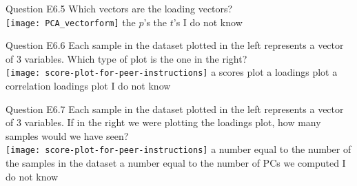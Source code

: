 \begin{frame}{Question E6.5}
	\QuestionBody
	{
		Which vectors are the loading vectors? \vspace{0.2cm} \\
		\centering
		\texttt{[image: PCA\_vectorform]}
	}
	\QuestionAnswers
	{
		\correctanswer the $p$'s
		\answer the $t$'s
		\answer I do not know
	}
\end{frame}


\begin{frame}{Question E6.6}
	\QuestionBody
	{
		Each sample in the dataset plotted in the left represents a vector of 3 variables. Which type of plot is the one in the right? \vspace{0.2cm} \\
		\centering
		\texttt{[image: score-plot-for-peer-instructions]}
	}
	\QuestionAnswers
	{
		\correctanswer a scores plot
		\answer a loadings plot
		\answer a correlation loadings plot
		\answer I do not know
	}
\end{frame}


\begin{frame}{Question E6.7}
	\QuestionBody
	{
		Each sample in the dataset plotted in the left represents a vector of 3 variables. If in the right we were plotting the loadings plot, how many samples would we have seen? \vspace{0.2cm} \\
		\centering
		\texttt{[image: score-plot-for-peer-instructions]}
	}
	\QuestionAnswers
	{
		\answer a number equal to the number of the samples in the dataset
		\answer a number equal to the number of PCs we computed
		\answer I do not know
	}
\end{frame}


